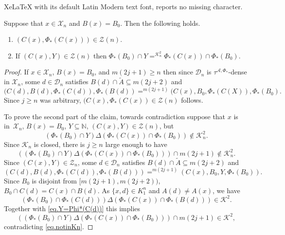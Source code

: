 \documentclass[10pt,a4paper]{amsart}
\newcommand{\bbN}{\mathbb N}
\newcommand{\cA}{\mathcal A}
\newcommand{\cK}{{\mathcal K}}
\newcommand{\cX}{\mathcal X}
\newcommand{\cZ}{\mathcal Z}
\newcommand{\calD}{{\mathcal D}}
\begin{document}
XeLaTeX with its default Latin Modern text font, reports no missing character.
\begin{claim}\label{C.Zn}
	Suppose that $x\in \cX_n$ and $B(x)=B_0$. Then the following holds. 
	\begin{enumerate}
		\item $(C(x),\Phi_*(C(x)))\in \cZ(n)$. 
		\item If $(C(x),Y)\in \cZ(n)$ then $\Phi_*(B_0)\cap Y=^{\cK_n^2} \Phi_*(C(x))\cap \Phi_*(B_0)$. 
	\end{enumerate}
		\end{claim}

\begin{proof} If $x\in \cX_n$, $B(x)=B_0$,  and $m(2j+1)\geq n$  then since $\calD_n$ is $\tau^{\cA,\Phi_*}$-dense in $\cX_n$,  some $d\in \calD_n$ satisfies 	$B(d)\cap \tilde A \subseteq  m(2j+2)$ and 
	\[
	(C(d), B(d), \Phi_*(C(d)), \Phi_*(B(d))=^{m(2j+1)} 
	(C(x), B_0, \Phi_*(C(X)), \Phi_*(B_0). 
	\]  
  Since $j\geq n$ was arbitrary, $(C(x), \Phi_*(C(x))\in \cZ(n)$ follows. 

To prove the second part of the claim, towards contradiction suppose that $x$ is in~$\cX_n$, $B(x)=B_0$, $Y\subseteq \bbN$,  $(C(x),Y)\in \cZ(n)$, but 
\[
(\Phi_*(B_0)\cap Y) \Delta (\Phi_*(C(x))\cap \Phi_*(B_0))\notin {\cK_n^2} .
\]
Since $\cK_n$ is closed, there is $j\geq n$ large enough to have 
\begin{equation}\label{eq.notinKn}
(( \Phi_*(B_0)\cap Y) \Delta (\Phi_*(C(x))\cap \Phi_*(B_0)))\cap m(2j+1)\notin {\cK_n^2} .
\end{equation}
Since $(C(x), Y)\in \cZ_n$, some $d\in \calD_n$ satisfies
$B(d)\cap \tilde A\subseteq m(2j+2)$ and   \begin{equation}\label{eq.Y=Phi*(C(d))}
(C(d), B(d), \Phi_*(C(d)), \Phi_*(B(d)))=^{m(2j+1)} 
(C(x), B_0, Y, \Phi_*(B_0)).
\end{equation}
Since $B_0$ is disjoint from $[m(2j+1), m(2j+2))$, $B_0\cap C(d)=C(x)\cap B(d)$. 
As $\{x,d\}\in K^n_1$ and  $A(d)\neq A(x)$, we have 
\[
(\Phi_*(B_0)\cap \Phi_*(C(d)))\Delta (\Phi_*(C(x))\cap
\Phi_*(B(d)))\in \cK^2.
\]
Together with \eqref{eq.Y=Phi*(C(d))} this implies 
\[
((\Phi_*(B_0)\cap Y)\Delta (\Phi_*(C(x))\cap
\Phi_*(B_0)))\cap m(2j+1)\in \cK^2, 
\]
contradicting \eqref{eq.notinKn}. 
\end{proof}
\end{document}
